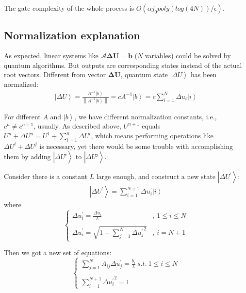 \documentclass[%
 reprint,
 amsmath,amssymb,
pra,
]{revtex4-1}
\begin{document}
The gate complexity of the whole process is $O(\alpha j_0poly(log(4N))/\epsilon)$.





\subsection{Normalization explanation}
As expected, linear systems like $\mathcal{A} \bm{\Delta U} = \bm{b}$ ($N$ variables) could be solved by quantum algorithms. But outputs are corresponding states instead of the actual root vectors. Different from vector $\bm{\Delta U}$, quantum state $\left| \Delta U\right\rangle$ has been normalized: 
\begin{align}
	\left| \Delta U\right\rangle = \frac{A^{-1} \left|b\right\rangle}{\left\|A^{-1} \left|b\right\rangle\right\|} = c A^{-1} \left|b\right\rangle = c \sum_{i=1}^{N} \Delta u_i\left|i\right\rangle
\end{align}

For different $A$ and $\left|b\right\rangle$, we have different normalization constants, i.e., $c^{n} \neq c^{n+1}$, usually. As described above, $U^{n+1}$ equals $U^{n} + \Delta U^{n} = U^{1} + \sum_{i=1}^{n} \Delta U^{i}$, which means performing operations like $\Delta U^{i} + \Delta U^{j}$ is necessary, yet there would be some trouble with accomplishing them by adding $\left|\Delta U^{i}\right\rangle$ to $\left|\Delta U^{j}\right\rangle$.

Consider there is a constant $L$ large enough, and construct a new state $\left|\Delta U^{\prime}\right\rangle$: 
\begin{align}
	\left|\Delta U^{\prime}\right\rangle = \sum_{i=1}^{N+1}\Delta  u_i^{\prime}\left|i\right\rangle
\end{align}
where
\begin{equation}
	\left\{
	\begin{array}{ll}
		\Delta u_i^{\prime} = \frac{\Delta u_i}{L}&,\ 1\leq i \leq N\\
		&\\
		\Delta u_i^{\prime} = \sqrt{1 - \sum_{j=1}^{N}{\Delta u_j^{\prime}}^2}&,\ i=N+1
	\end{array}
	\right.
\end{equation}

Then we got a new set of equations:
\begin{equation}\label{eq:Delta_u_prime_equations}
	\left\{
	\begin{array}{l}
		\sum_{j=1}^{N}A_{ij}\Delta u_j^{\prime} = \frac{b_i}{L} \ s.t. \ 1\leq i \leq N\\
		\\
		\sum_{i=1}^{N + 1}{\Delta u_i^{\prime}}^2 = 1
	\end{array}
	\right.
\end{equation}
\end{document}
